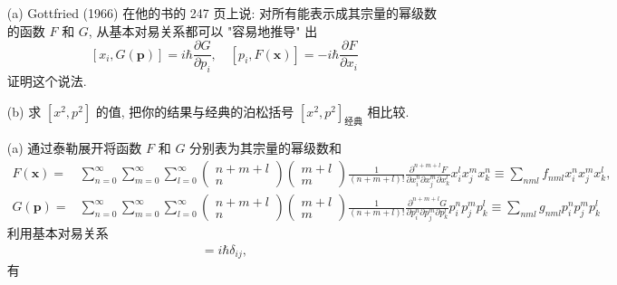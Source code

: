 \documentclass{assignment}
\begin{document}
\begin{prob}[课本习题 1.29]
    \begin{itemize}
        \item[(a)] Gottfried (1966) 在他的书的 247 页上说: 对所有能表示成其宗量的幂级数的函数 $F$ 和 $G$, 从基本对易关系都可以 "容易地推导" 出
        \[
            [x_i,G(\bm{p})]=i\hbar\frac{\partial G}{\partial p_i},\quad[p_i,F(\bm{x})]=-i\hbar\frac{\partial F}{\partial x_i}
        \]
        证明这个说法.
        \item[(b)] 求 $[x^2,p^2]$ 的值, 把你的结果与经典的泊松括号 $[x^2,p^2]_{\text{经典}}$ 相比较.
    \end{itemize}
\end{prob}
\begin{sol}
    \begin{itemize}
        \item[(a)] 通过泰勒展开将函数 $F$ 和 $G$ 分别表为其宗量的幂级数和
        \begin{align}
            F(\bm{x})=&\sum_{n=0}^{\infty}\sum_{m=0}^{\infty}\sum_{l=0}^{\infty}\begin{pmatrix}
                n+m+l\\
                n
            \end{pmatrix}\begin{pmatrix}
                m+l\\
                m
            \end{pmatrix}\frac{1}{(n+m+l)!}\frac{\partial^{n+m+l}F}{\partial x_i^n\partial x_j^m\partial x_k^l}x_i^lx_j^mx_k^n\equiv\sum_{nml}f_{nml}x_i^nx_j^mx_k^l,\\
            G(\bm{p})=&\sum_{n=0}^{\infty}\sum_{m=0}^{\infty}\sum_{l=0}^{\infty}\begin{pmatrix}
                n+m+l\\
                n
            \end{pmatrix}\begin{pmatrix}
                m+l\\
                m
            \end{pmatrix}\frac{1}{(n+m+l)!}\frac{\partial^{n+m+l}G}{\partial p_i^n\partial p_j^m\partial p_k^l}p_i^np_j^mp_k^l\equiv\sum_{nml}g_{nml}p_i^np_j^mp_k^l
        \end{align}
        利用基本对易关系
        \begin{align}
            [x_i,p_j]=i\hbar\delta_{ij},
        \end{align}
        有
        \begin{align}

\end{align}
\end{itemize}
\end{sol}
\end{document}

